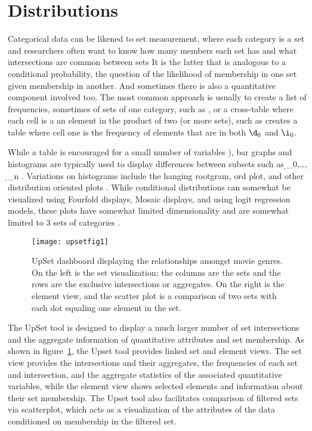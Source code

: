 \documentclass[../main.text]{subfiles}
\begin{document}
\section{Distributions}

Categorical data can be likened to set measurement, where each category is a set
and researchers often want to know how many members each set has and what
intersections are common between sets \cite{agresti_categorical_2011,schneider_set-theoretic_2012}
  It is the latter that is analogous to a
conditional probability, the question of the likelihood of membership in one
set given membership in another. And sometimes there is also a quantitative
component involved too. The most common approach is usually to create a list of frequencies, sometimes of sets of one category, such as \D, or a cross-table\cite{goodman} where each cell is a an element in the product of two (or more sets), such as \D\cross \I creates a table
 where cell one is the frequency of elements that are in both $\d_0$ and
 $\i_0$.

 While a table is encouraged for a small number of variables
 \cite{munznertablesgood}), bar graphs and histograms are typically used to display
 differences between subsets such as \d_0,\dots, \d_n
 \cite{ioannidis_history_2003-1, friendly_brief_2006}. Variations on histograms
 include the hanging rootgram, ord plot, and other distribution oriented
 plots \cite{tukey_exploratory_1977, friendly_visualizing_2000}. While conditional  distributions can somewhat be visualized using Fourfold displays, Mosaic displays, and using logit regression models, these plots have somewhat limited dimensionality and are somewhat limited to 3 sets of categories
 \cite{friendly_visualizing_2000}. 
   
 
 \begin{figure}
   \texttt{[image: upsetfig1]}
   \caption{UpSet dashboard displaying the relationships amongst movie
     genres. On the left is the set visualization; the columns are the sets and
     the rows are the exclusive intersections or aggregates. On the right is
     the element view, and the scatter plot is a comparison of two sets with
     each dot equaling one element in the set.}
   \label{fig:upsetfig}
 \end{figure}

The UpSet tool is designed to
display a much larger number of set intersections and the aggregate
information of quantitative attributes and set membership. \cite{lex_upset:_2014}
As shown in figure~\ref{fig:upsetfig}, the Upset tool provides linked set and element views. The set view provides the intersections and their
aggregates, the frequencies of each set and intersection, and the aggregate
statistics of the associated quantitative variables, while the element view shows
selected elements and information about their set membership. The Upset tool
also facilitates comparison of filtered sets via scatterplot, which acts as a
visualization of the attributes of the data conditioned on membership in the
filtered set.  
\end{document}
